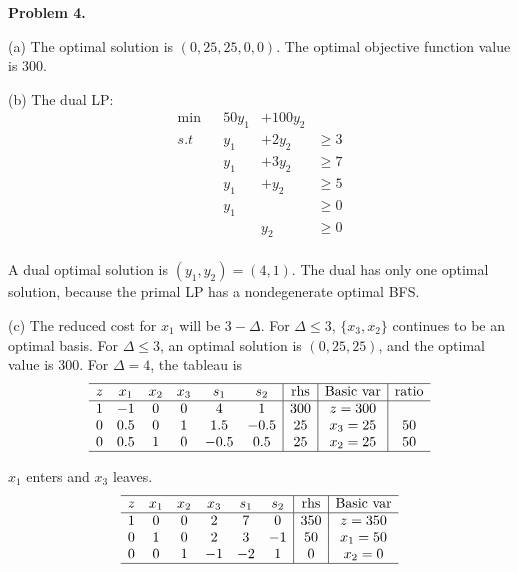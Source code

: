 \documentclass[12pt]{article}
\begin{document}
\vspace{\baselineskip}
\noindent
\textbf{Problem 4.}

(a) The optimal solution is $(0,25,25,0,0)$. The optimal objective function value is 300.

(b) The dual LP:
\begin{equation*}
  \begin{array}{cccccccc}
    \text{min}&    &      50y_1    & +100y_2  &       \\ 
    s.t       &    &    y_1      &   +2y_2 &    \ge 3      \\
              &    &    y_1      &    +3y_2 &   \ge 7        \\
              &    &    y_1      &    +y_2 &   \ge 5   \\ 
              &    &    y_1      &        &   \ge 0  \\ 
              &    &          &   y_2     &   \ge 0  \\ 
  \end{array}
\end{equation*}

A dual optimal solution is $(y_1,y_2) = (4,1)$. The dual has only one optimal solution, because the primal LP has a nondegenerate optimal BFS.

(c) The reduced cost for $x_1$ will be $3-\Delta$. For $\Delta \le 3$, $\{x_3,x_2\}$ continues to be an optimal basis. For $\Delta \le 3$, an optimal solution is $(0,25,25)$, and the optimal value is 300. For $\Delta = 4$, the tableau is
\begin{equation*}
  \begin{array}{cccccc|c|c|c}
    \hline
    z &  x_1      &  x_2 &  x_3 &  s_1 & s_2 &   \text{rhs} & \text{Basic var} & \text{ratio}  \\ \hline
    1 &    -1     &    0 &    0 &    4 & 1    & 300        &  z=300              \\
    0 &    0.5      &    0 &    1 &    1.5 &    -0.5 & 25        &  x_3 = 25   & 50       \\
    0 &    0.5      &    1 &    0 &    -0.5 &    0.5 & 25        &  x_2 = 25    & 50      \\ \hline
  \end{array}
\end{equation*}

$x_1$ enters and $x_3$ leaves.
\begin{equation*}
  \begin{array}{cccccc|c|c}
    \hline
    z &  x_1      &  x_2 &  x_3 &  s_1 & s_2 &   \text{rhs} & \text{Basic var}  \\ \hline
    1 &    0     &    0 &    2 &    7 & 0    & 350        &  z=350              \\
    0 &    1      &    0 &    2 &    3 &    -1 & 50        &  x_1 = 50    \\
    0 &    0      &    1 &    -1 &    -2 &    1 & 0        &  x_2 = 0      \\ \hline
  \end{array}
\end{equation*}
\end{document}
